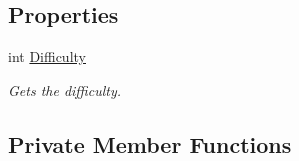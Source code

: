 \subsection*{Properties}
\begin{DoxyCompactItemize}
\item 
int \hyperlink{classXaria_1_1Level_a088431ceff97978eb6b0c9aae95ccfd2}{Difficulty}
\begin{DoxyCompactList}\small\item\em Gets the difficulty. \end{DoxyCompactList}\end{DoxyCompactItemize}
\subsection*{Private Member Functions}
